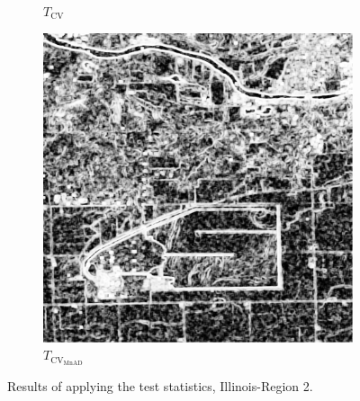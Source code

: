 \begin{figure}[H]
\begin{subfigure}[b]{0.3\textwidth}
    \caption{$T_\text{CV}$}
    \label{fig:real_images_test_Illinois-2}
  \end{subfigure}
  \hfill
  \begin{subfigure}[b]{0.3\textwidth}
    \centering
    \includegraphics[width=\textwidth]{../../Figures/PNG/mnad_Illinois_crops_1024}
    \caption{$T_{\text{CV}_{\text{MnAD}}}$}
    \label{fig:real_images_test_Illinois-3}
  \end{subfigure}
  \caption{Results of applying the test statistics, Illinois-Region 2.}
  \label{fig:real_images_test_Illinois}
\end{figure}


